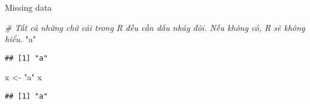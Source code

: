 \documentclass[
  ignorenonframetext,
]{beamer}
\newenvironment{Shaded}{}{}
\newcommand{\CommentTok}[1]{\textcolor[rgb]{0.38,0.63,0.69}{\textit{#1}}}
\newcommand{\NormalTok}[1]{#1}
\newcommand{\StringTok}[1]{\textcolor[rgb]{0.25,0.44,0.63}{#1}}
\begin{document}
\begin{frame}[fragile]{Missing data}
\protect\hypertarget{missing-data-1}{}

\begin{Shaded}
\begin{Highlighting}[]
\CommentTok{# Tất cả những chữ cái trong R đều cần dấu nháy đôi. Nếu không có, R sẽ không hiểu. }
\StringTok{"a"}
\end{Highlighting}
\end{Shaded}

\begin{verbatim}
## [1] "a"
\end{verbatim}

\begin{Shaded}
\begin{Highlighting}[]
\NormalTok{x <-}\StringTok{ "a"}
\NormalTok{x}
\end{Highlighting}
\end{Shaded}

\begin{verbatim}
## [1] "a"
\end{verbatim}

\end{frame}
\end{document}
